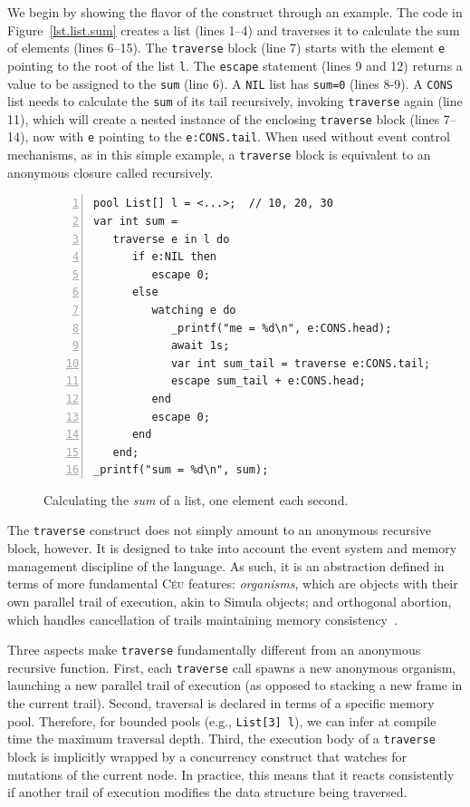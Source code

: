 \documentclass{acm_proc_article-sp}
\newcommand{\CEU}{\textsc{C\'{e}u}\xspace}
\newcommand{\code}[1] {{\small{\texttt{#1}}}}
\begin{document}
We begin by showing the flavor of the construct through an example.
The code in Figure~\ref{lst.list.sum} creates a list (lines 1--4) and traverses 
it to calculate the sum of elements (lines 6--15).
The \code{traverse} block (line 7) starts with the element \code{e} pointing to 
the root of the list \code{l}.
The \code{escape} statement (lines 9 and 12) returns a value to be assigned to 
the \code{sum} (line 6).
A \code{NIL} list has \code{sum=0} (lines 8-9).
A \code{CONS} list needs to calculate the \code{sum} of its tail recursively, 
invoking \code{traverse} again (line 11), which will create a nested instance 
of the enclosing \code{traverse} block (lines 7--14), now with \code{e} 
pointing to the \code{e:CONS.tail}.
When used without event control mechanisms, as in this simple example,
a \code{traverse} block is equivalent to an anonymous closure called recursively.

\begin{figure}%
\begin{lstlisting}[numbers=left,xleftmargin=3em]
pool List[] l = <...>;  // 10, 20, 30
var int sum =
   traverse e in l do
      if e:NIL then
         escape 0;
      else
         watching e do
            _printf("me = %d\n", e:CONS.head);
            await 1s;
            var int sum_tail = traverse e:CONS.tail;
            escape sum_tail + e:CONS.head;
         end
         escape 0;
      end
   end;
_printf("sum = %d\n", sum);
\end{lstlisting}
\caption{
Calculating the \emph{sum} of a list, one element each second.
\label{lst.list.sum.react}
}
\end{figure}

The \code{traverse} construct does not simply amount to an anonymous recursive
block, however. It is designed to take into account the event system and
memory management discipline of the language. As such, it is an abstraction
defined in terms of more fundamental \CEU features: \emph{organisms}, which
are objects with their own parallel trail of execution, akin to Simula
objects; and orthogonal abortion, which handles cancellation of trails
maintaining memory consistency~\cite{ceu.mod15}.

Three aspects make \code{traverse} fundamentally different from an anonymous
recursive function. First, each \code{traverse} call spawns a new anonymous
organism, launching a new parallel trail of execution (as opposed to stacking
a new frame in the current trail). Second, traversal is declared in terms of a
specific memory pool. Therefore, for bounded pools (e.g., \code{List[3] l}),
we can infer at compile time the maximum traversal depth. Third, the execution
body of a \code{traverse} block is implicitly wrapped by a concurrency
construct that watches for mutations of the current node. In practice, this
means that it reacts consistently if another trail of execution modifies the
data structure being traversed.
\end{document}
